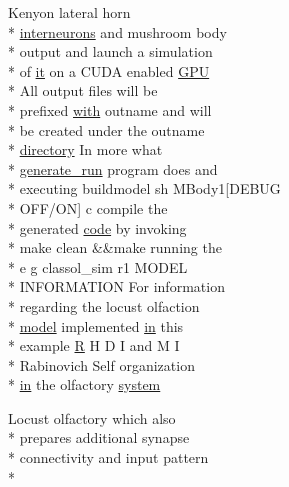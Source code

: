 \begin{DoxyCompactItemize}
Kenyon lateral horn \\*
\hyperlink{userproject_2SynDelay__project_2README_8txt_adf6327d22e2c11a62a22ab5afd4f2b81}{interneurons} and mushroom body \\*
output and launch a simulation \\*
of \hyperlink{userproject_2PoissonIzh__project_2README_8txt_a3e3bbb6c9b14c38757cf273a117e43e8}{it} on a C\+U\+D\+A enabled \hyperlink{modelSpec_8h_a39cb9803524b6f3b783344b2f89867b4}{G\+P\+U} \\*
All output files will be \\*
prefixed \hyperlink{userproject_2OneComp__project_2README_8txt_ace09bb40fbf4457ad9a9340a67a4fa9a}{with} outname and will \\*
be created under the outname \\*
\hyperlink{README_8txt_ae619b68020535fba5ac79522a0d9d1c4}{directory} In more what \\*
\hyperlink{userproject_2MBody__userdef__project_2README_8txt_a320a215d1e27b4de394be70e90d22863}{generate\+\_\+run} program does and \\*
executing buildmodel sh M\+Body1\mbox{[}D\+E\+B\+U\+G \\*
O\+F\+F/O\+N\mbox{]} c compile the \\*
generated \hyperlink{userproject_2MBody__userdef__project_2README_8txt_aeec4e596748e7c29dd5548dae4c70685}{code} by invoking \\*
make clean \&\&make running the \\*
e g classol\+\_\+sim r1 M\+O\+D\+E\+L \\*
I\+N\+F\+O\+R\+M\+A\+T\+I\+O\+N For information \\*
regarding the locust olfaction \\*
\hyperlink{README_8txt_a69fd801b7213948c12d9dd7eebb3ed14}{model} implemented \hyperlink{README_8txt_a148897a6b2cc9cff25af80abb13426b0}{in} this \\*
example \hyperlink{gen__syns__sparse__izhModel_8cc_ac06fcc1e53c6b21275aec67047473a28}{R} H D I and M I \\*
Rabinovich Self organization \\*
\hyperlink{README_8txt_a148897a6b2cc9cff25af80abb13426b0}{in} the olfactory \hyperlink{userproject_2MBody1__project_2README_8txt_a72470cf24c5ff00591114dd965291668}{system}
\item 
Locust olfactory which also \\*
prepares additional synapse \\*
connectivity and input pattern \\*

\end{DoxyCompactItemize}
